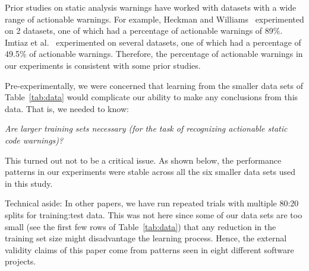 Prior studies on static analysis warnings have worked with datasets with a wide range of actionable warnings. For example, Heckman and Williams~\cite{heckman2008establishing} experimented on 2 datasets, one of which had a percentage of actionable warnings of 89\%. 
Imtiaz et al.~\cite{imtiaz2019developers} experimented on several datasets, one of which had a percentage of 49.5\% of actionable warnings. 
Therefore, the percentage of actionable warnings in our experiments is consistent with some prior studies. 

 
Pre-experimentally, we were concerned that learning from the smaller data sets of Table~\ref{tab:data} would complicate
our ability to make any conclusions from this data.
That is, we needed to know:

\begin{formal}\noindent
{} \textit{Are larger training sets necessary (for the task of recognizing actionable static code warnings)?}
\end{formal}

This turned out not to be a critical issue.
As shown below, the performance patterns   
in our experiments were   stable across all the six smaller data sets used in this study.



Technical aside: In other papers, we have run repeated trials with multiple 80:20
splits for training:test data. 
This was not here since some of our data sets are too small (see the first few rows of  Table~\ref{tab:data})
that any reduction in the training set size might disadvantage the learning process. 
Hence, the external validity claims of this paper come from patterns seen in eight different software projects.



